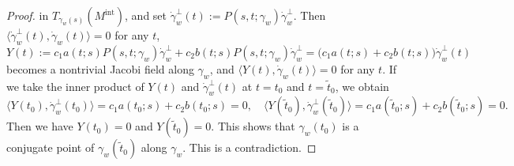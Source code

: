 \documentclass[a4paper,11pt,reqno]{amsart}
\numberwithin{equation}{section}
\theoremstyle{definition}
\theoremstyle{remark}
\begin{document}
\begin{proof}
in $T_{\gamma_w(s)}(M^\text{int})$, and set $\dot{\gamma}_w^\perp(t):=P(s,t;\gamma_w)\dot{\gamma}_w^\perp$. 
Then $\langle\dot{\gamma}_w^\perp(t),\dot{\gamma}_w(t)\rangle=0$ for any $t$, 
%
%
$$
Y(t)
:=
c_1a(t;s)P(s,t;\gamma_w)\dot{\gamma}_w^\perp+c_2b(t;s)P(s,t;\gamma_w)\dot{\gamma}_w^\perp
=
\bigl(c_1a(t;s)+c_2b(t;s)\bigr)\dot{\gamma}_w^\perp(t)
$$
%
%
becomes a nontrivial Jacobi field along $\gamma_w$, and $\langle{Y(t),\dot{\gamma}_w(t)}\rangle=0$ for any $t$. 
If we take the inner product of $Y(t)$  and $\dot{\gamma}_w^\perp(t)$ at $t=t_0$ and $t=\tilde{t}_0$, we obtain 
%
%
$$
\langle{Y(t_0),\dot{\gamma}_w^\perp(t_0)}\rangle
=
c_1a(t_0;s) + c_2b(t_0;s)=0, 
\quad
\langle{Y(\tilde{t}_0),\dot{\gamma}_w^\perp(\tilde{t}_0)}\rangle
=
c_1a(\tilde{t}_0;s) + c_2b(\tilde{t}_0;s)=0. 
$$
%
%
Then we have $Y(t_0)=0$ and $Y(\tilde{t}_0)=0$. This shows that $\gamma_w(t_0)$ is a conjugate point of $\gamma_w(\tilde{t}_0)$ along $\gamma_w$. This is a contradiction. 
%
%
%
%

\end{proof}
\end{document}
